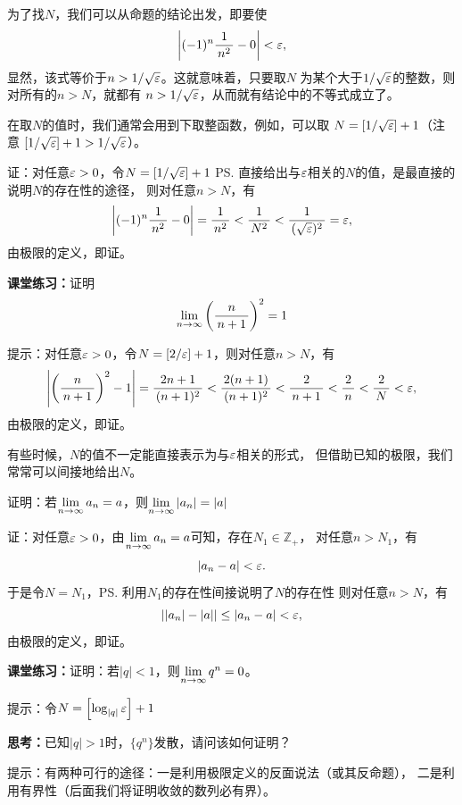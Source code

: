 为了找$N$，我们可以从命题的结论出发，即要使
$$\left|(-1)^n\df1{n^2}-0\right|<\e,$$
显然，该式等价于$n>1/{\sqrt{\e}}$。这就意味着，只要取$N$
为某个大于$1/\sqrt{\e}$的整数，则对所有的$n>N$，就都有
$n>1/\sqrt{\e}$，从而就有结论中的不等式成立了。

在取$N$的值时，我们通常会用到下取整函数，例如，可以取
$N=\left[1/\sqrt{\e}\right]+1$（注意
$\left[1/\sqrt{\e}\right]+1>1/\sqrt{\e}$）。

证：对任意$\e>0$，令$N=\left[1/\sqrt{\e}\right]+1$
\ps{直接给出与$\e$相关的$N$的值，是最直接的说明$N$的存在性的途径}，
则对任意$n>N$，有
$$\left|(-1)^n\df1{n^2}-0\right|=\df1{n^2}<\df1{N^2}
<\df1{(\sqrt{\e})^2}=\e,$$
由极限的定义，即证。
\fin 

\bs
{\bf 课堂练习：}证明
$$\limn\left(\df n{n+1}\right)^2=1$$

\ifhint
提示：对任意$\e>0$，令$N=\left[2/\e\right]+1$，则对任意$n>N$，有
$$\left|\left(\df
n{n+1}\right)^2-1\right|=\df{2n+1}{(n+1)^2}<\df{2(n+1)}{(n+1)^2}
<\df2{n+1}<\df2n<\df2N<\e,$$
由极限的定义，即证。\fin
\fi

有些时候，$N$的值不一定能直接表示为与$\e$相关的形式，
但借助已知的极限，我们常常可以间接地给出$N$。

\bs
\egz 证明：若$\limn a_n=a$，则$\limn|a_n|=|a|$

证：对任意$\e>0$，由$\limn a_n=a$可知，存在$N_1\in\mathbb{Z}_+$，
对任意$n>N_1$，有
$$|a_n-a|<\e.$$
于是令$N=N_1$，\ps{利用$N_1$的存在性间接说明了$N$的存在性}
则对任意$n>N$，有
$$||a_n|-|a||\leq|a_n-a|<\e,$$
由极限的定义，即证。\fin 

\bs
{\bf 课堂练习：}证明：若$|q|<1$，则$\limn q^n=0$。

\ifhint
提示：令$N=\left[\log_{|q|}\e\right]+1$
\fi

\bs
{\bf 思考：}已知$|q|>1$时，$\{q^n\}$发散，请问该如何证明？

\ifhint 
提示：有两种可行的途径：一是利用极限定义的反面说法（或其反命题），
二是利用有界性（后面我们将证明收敛的数列必有界）。
\fi


